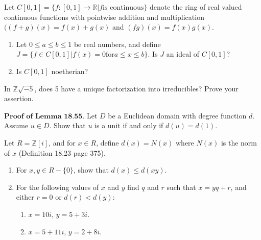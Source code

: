 \documentclass[12pt,letterpaper,boxed]{hmcpset}
\begin{document}

\begin{problem}[18.2.6]
Let $C[0,1] = \{f:[0,1] \rightarrow \mathbb{R} \vert f \text{is continuous}\}$ denote the ring of real valued continuous functions with pointwise addition and multiplication $((f+g)(x) = f(x)+g(x)$ and $(fg)(x) = f(x)g(x)$. 
\begin{enumerate}[label=\alph*]
\item Let $0 \leq a \leq b \leq 1$ be real numbers, and define $J = \{ f\in C[0,1] \vert f(x) = 0 \text{for} a \leq x \leq b\}$. Is $J$ an ideal of $C[0,1]$?
\item Is $C[0,1]$ noetherian?
\end{enumerate}
\end{problem}

\begin{solution}
\end{solution}

\clearpage

\begin{problem}[18.3.6]
In $\mathbb{Z}\sqrt{-5}$, does 5 have a unique factorization into irreducibles? Prove your assertion.
\end{problem}

\begin{solution}
\end{solution}

\clearpage

\begin{problem}[18.4.1]
$\textbf{Proof of Lemma 18.55.}$ Let $D$ be a Euclidean domain with degree function $d$. Assume $u \in D$. Show that $u$ is a unit if and only if $d(u) = d(1)$.
\end{problem}

\begin{solution}
\end{solution}

\clearpage

\begin{problem}[18.4.6]
Let $R = \mathbb{Z}[i]$, and for $x \in R$, define $d(x) = N(x)$ where $N(x)$ is the norm of $x$ (Definition 18.23 page 375).
\begin{enumerate}[label=\alph*]
\item For $x,y \in R - \{0\}$, show that $d(x) \leq d(xy)$.
\item For the following values of $x$ and $y$ find $q$ and $r$ such that $x = yq+r$, and either $r = 0$ or $d(r) < d(y)$:
\begin{enumerate}
\item $x = 10i$, $y = 5+3i$.
\item $x = 5+11i$, $y = 2+8i$.
\end{enumerate}
\end{enumerate}
\end{problem}
\end{document}
